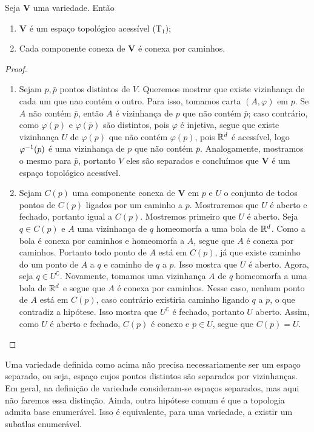 \begin{prop}
Seja $\bm V$ uma variedade. Então
	\begin{enumerate}
	\item $\bm V$  é um espaço topológico acessível (T$_1$);
	\item Cada componente conexa de $\bm V$ é conexa por caminhos.
	\end{enumerate}
\end{prop}
\begin{proof}
	\begin{enumerate}
	\item Sejam $p,\bar p$ pontos distintos de $V$. Queremos mostrar que existe vizinhança de cada um que nao contém o outro. Para isso, tomamos carta $(A,\varphi)$ em $p$. Se $A$ não contém $\bar p$, então $A$ é vizinhança de $p$ que não contém $\bar p$; caso contrário, como $\varphi(p)$ e $\varphi(\bar p)$ são distintos, pois $\varphi$ é injetiva, segue que existe vizinhança $U$ de $\varphi(p)$ que não contém $\varphi(p)$, pois $\mathbb{R}^d$ é acessível, logo $\varphi^{-1}(p)$ é uma vizinhança de $p$ que não contém $\bar p$. Analogamente, mostramos o mesmo para $\bar p$, portanto $V$ eles são separados e concluímos que $\bm V$ é um espaço topológico acessível.
	
	\item Sejam $C(p)$ uma componente conexa de $\bm V$ em $p$ e $U$ o conjunto de todos pontos de $C(p)$ ligados por um caminho a $p$. Mostraremos que $U$ é aberto e fechado, portanto igual a $C(p)$. Mostremos primeiro que $U$ é aberto. Seja $q \in C(p)$ e $A$ uma vizinhança de $q$ homeomorfa a uma bola de $\mathbb{R}^d$. Como a bola é conexa por caminhos e homeomorfa a $A$, segue que $A$ é conexa por caminhos. Portanto todo ponto de $A$ está em $C(p)$, já que existe caminho do um ponto de $A$ a $q$ e caminho de $q$ a $p$. Isso mostra que $U$ é aberto. Agora, seja $q \in U^\complement$. Novamente, tomamos uma vizinhança $A$ de $q$ homeomorfa a uma bola de $\mathbb{R}^d$ e segue que $A$ é conexa por caminhos. Nesse caso, nenhum ponto de $A$ está em $C(p)$, caso contrário existiria caminho ligando $q$ a $p$, o que contradiz a hipótese. Isso mostra que $U^\complement$ é fechado, portanto $U$ aberto. Assim, como $U$ é aberto e fechado, $C(p)$ é conexo e $p \in U$, segue que $C(p)=U$.
	\end{enumerate}
\end{proof}

Uma variedade definida como acima não precisa necessariamente ser um espaço separado, ou seja, espaço cujos pontos distintos são separados por vizinhanças. Em geral, na definição de variedade consideram-se espaços separados, mas aqui não faremos essa distinção. Ainda, outra hipótese comum é que a topologia admita base enumerável. Isso é equivalente, para uma variedade, a existir um subatlas enumerável.

